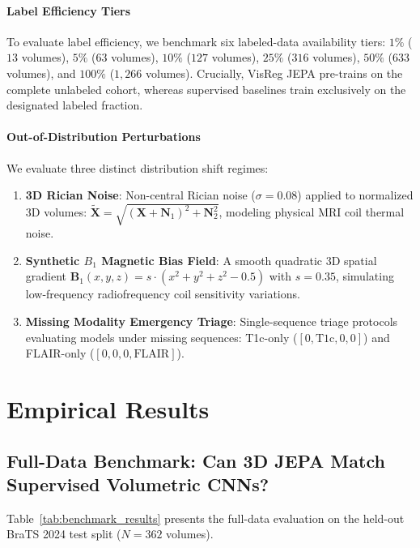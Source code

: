 \documentclass{article}
\begin{document}
\paragraph{Label Efficiency Tiers}
To evaluate label efficiency, we benchmark six labeled-data availability tiers: $1\%$ ($13$ volumes), $5\%$ ($63$ volumes), $10\%$ ($127$ volumes), $25\%$ ($316$ volumes), $50\%$ ($633$ volumes), and $100\%$ ($1,266$ volumes). Crucially, VisReg JEPA pre-trains on the complete unlabeled cohort, whereas supervised baselines train exclusively on the designated labeled fraction.

\paragraph{Out-of-Distribution Perturbations}
We evaluate three distinct distribution shift regimes:
\begin{enumerate}
    \item \textbf{3D Rician Noise}: Non-central Rician noise ($\sigma = 0.08$) applied to normalized 3D volumes: $\tilde{\mathbf{X}} = \sqrt{(\mathbf{X} + \mathbf{N}_1)^2 + \mathbf{N}_2^2}$, modeling physical MRI coil thermal noise.
    \item \textbf{Synthetic $B_1$ Magnetic Bias Field}: A smooth quadratic 3D spatial gradient $\mathbf{B}_1(x, y, z) = s \cdot (x^2 + y^2 + z^2 - 0.5)$ with $s = 0.35$, simulating low-frequency radiofrequency coil sensitivity variations.
    \item \textbf{Missing Modality Emergency Triage}: Single-sequence triage protocols evaluating models under missing sequences: T1c-only ($[0, \text{T1c}, 0, 0]$) and FLAIR-only ($[0, 0, 0, \text{FLAIR}]$).
\end{enumerate}


\section{Empirical Results}
\label{sec:results}

\subsection{Full-Data Benchmark: Can 3D JEPA Match Supervised Volumetric CNNs?}
\label{sec:results_full_data}

Table~\ref{tab:benchmark_results} presents the full-data evaluation on the held-out BraTS 2024 test split ($N=362$ volumes).
\end{document}
